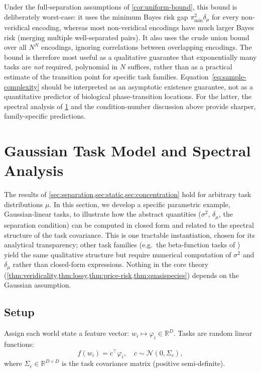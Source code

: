 \documentclass[12pt]{article}
\newcommand{\dmu}{\delta_\mu}
\newcommand{\pimin}{\pi_{\min}}
\newcommand{\sigmasq}{\sigma^2}
\newcommand{\R}{\mathbb{R}}
\begin{document}
Under the full-separation assumptions of \cref{cor:uniform-bound}, this bound is deliberately worst-case: it uses the minimum Bayes risk gap $\pimin^2 \dmu$ for every non-veridical encoding, whereas most non-veridical encodings have much larger Bayes risk (merging multiple well-separated pairs). It also uses the crude union bound over all $N^N$ encodings, ignoring correlations between overlapping encodings. The bound is therefore most useful as a qualitative guarantee that exponentially many tasks are \emph{not} required, polynomial in $N$ suffices, rather than as a practical estimate of the transition point for specific task families. Equation~\eqref{eq:sample-complexity} should be interpreted as an asymptotic existence guarantee, not as a quantitative predictor of biological phase-transition locations. For the latter, the spectral analysis of \cref{sec:gaussian} and the condition-number discussion above provide sharper, family-specific predictions.

\section{Gaussian Task Model and Spectral Analysis}\label{sec:gaussian}

The results of \cref{sec:separation,sec:static,sec:concentration} hold for arbitrary task distributions $\mu$. In this section, we develop a specific parametric example, Gaussian-linear tasks, to illustrate how the abstract quantities ($\sigmasq$, $\dmu$, the separation condition) can be computed in closed form and related to the spectral structure of the task covariance. This is one tractable instantiation, chosen for its analytical transparency; other task families (e.g.\ the beta-function tasks of \citeauthor{berke_etal_2022}) yield the same qualitative structure but require numerical computation of $\sigmasq$ and $\dmu$ rather than closed-form expressions. Nothing in the core theory (\cref{thm:veridicality,thm:lossy,thm:price-risk,thm:quasispecies}) depends on the Gaussian assumption.

\subsection{Setup}\label{sec:gaussian-setup}

Assign each world state a feature vector: $w_i \mapsto \varphi_i \in \R^D$. Tasks are random linear functions:
\begin{equation}\label{eq:gaussian-task}
f(w_i) = c^\top \varphi_i, \quad c \sim \mathcal{N}(0, \Sigma_c),
\end{equation}
where $\Sigma_c \in \R^{D \times D}$ is the task covariance matrix (positive semi-definite).
\end{document}
